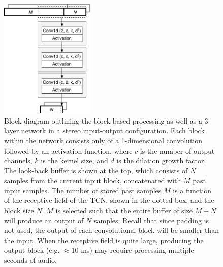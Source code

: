 \documentclass{article}
\begin{document}
\begin{figure}[htb!]
  \centering
  \includegraphics[width=0.4\textwidth]{plugin-diagram-v2.pdf}  
  \caption{Block diagram outlining the block-based processing as well as a 3-layer network in a stereo input-output configuration. 
  Each block within the network consists only of a 1-dimensional convolution followed by an activation function,
  where $c$ is the number of output channels, $k$ is the kernel size, and $d$ is the dilation growth factor.
  The look-back buffer is shown at the top, which consists of $N$ samples from the current input block, 
  concatenated with $M$ past input samples. The number of stored past samples $M$ is a function 
  of the receptive field of the TCN, shown in the dotted box, and the block size $N$. 
  $M$ is selected such that the entire buffer of size $M+N$ will produce an output of $N$ samples.
  Recall that since padding is not used, the output of each convolutional block will be smaller than the input. 
  When the receptive field is quite large, producing the output block (e.g. $\approx 10$ ms)
   may require processing multiple seconds of audio.}
  \label{fig:arch}
\end{figure} 

%    
\end{document}
